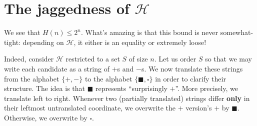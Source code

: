 \documentclass[openany, notitlepage, justified]{tufte-book}
\newcommand{\Hh}{\mathcal{H}}
\begin{document}
        \section{The jaggedness of $\Hh$}

            We see that $H(n) \leq 2^n$.  What's amazing is that this bound is
            never somewhat-tight: depending on $\Hh$, it either is an equality
            or extremely loose!

            Indeed, consider $\Hh$ restricted to a set $S$ of size $n$.  Let us
            order $S$ so that we may write each candidate as a string of $+$s
            and $-$s.  We now translate these strings from the alphabet
            $\{+,-\}$ to the alphabet $\{\blacksquare,\square\}$ in order to
            clarify their structure.
            The idea is that $\blacksquare$ represents ``surprisingly $+$''.
            More precisely, we translate left to right.  Whenever two
            (partially translated) strings differ \textbf{only} in their
            leftmost untranslated coordinate, we overwrite the $+$ version's
            $+$ by $\blacksquare$.  Otherwise, we overwrite by $\square$.
\end{document}
